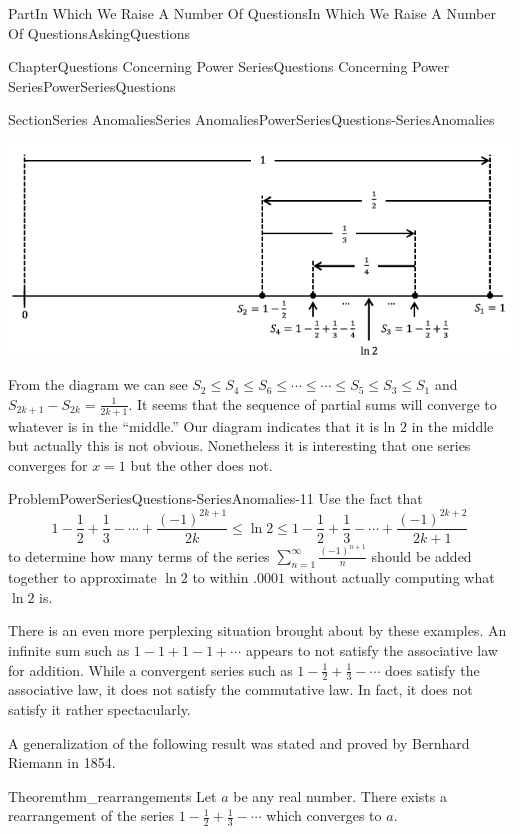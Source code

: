 \documentclass[oneside,10pt,]{book}
\numberwithin{equation}{part}
\begin{document}
\begin{partptx}{Part}{In Which We Raise A Number Of Questions}{}{In Which We Raise A Number Of Questions}{}{}{AskingQuestions}
\begin{chapterptx}{Chapter}{Questions Concerning Power Series}{}{Questions Concerning Power Series}{}{}{PowerSeriesQuestions}
\begin{sectionptx}{Section}{Series Anomalies}{}{Series Anomalies}{}{}{PowerSeriesQuestions-SeriesAnomalies}
\begin{image}{0.05}{0.9}{0.05}{}
\includegraphics[width=\linewidth]{external/images/AltHarmonic.png}
\end{image}%
From the diagram we can see \(S_2\leq S_4\leq S_6\leq\cdots\leq\cdots\leq S_5\leq S_3\leq S_1\) and \(S_{2k+1}-S_{2k}=\frac{1}{2k+1}\). It seems that the sequence of partial sums will converge to whatever is in the ``middle.'' Our diagram indicates that it is ln \(2\) in the middle but actually this is not obvious. Nonetheless it is interesting that one series converges for \(x=1\) but the other does not.%
\begin{problem}{Problem}{}{PowerSeriesQuestions-SeriesAnomalies-11}%
 Use the fact that%
\begin{equation*}
1-\frac{1}{2}+\frac{1}{3}-\cdots+\frac{(-1)^{2k+1}}{2k}\leq\ln 2\leq 1-\frac{1}{2}+\frac{1}{3}-\cdots+\frac{(-1)^{2k+2}}{2k+1}
\end{equation*}
to determine how many terms of the series \(\sum_{n=1}^\infty\frac{(-1)^{n+1}}{n}\) should be added together to approximate \(\ln 2\) to within \(.0001\) without actually computing what \(\ln 2\) is.%
\end{problem}
There is an even more perplexing situation brought about by these examples. An infinite sum such as \(1-1+1-1+\cdots\) appears to not satisfy the associative law for addition. While a convergent series such as \(1-\frac{1}{2}+\frac{1}{3}-\cdots\) does satisfy the associative law, it does not satisfy the commutative law. In fact, it does not satisfy it rather spectacularly.%
\par
A generalization of the following result was stated and proved by Bernhard Riemann  in 1854.%
\begin{theorem}{Theorem}{}{}{thm_rearrangements}%
%
Let \(a\) be any real number. There exists a rearrangement of the series \(1-\frac{1}{2}+\frac{1}{3}-\cdots\) which converges to \(a\).%

\end{theorem}
\end{sectionptx}
\end{chapterptx}
\end{partptx}
\end{document}
